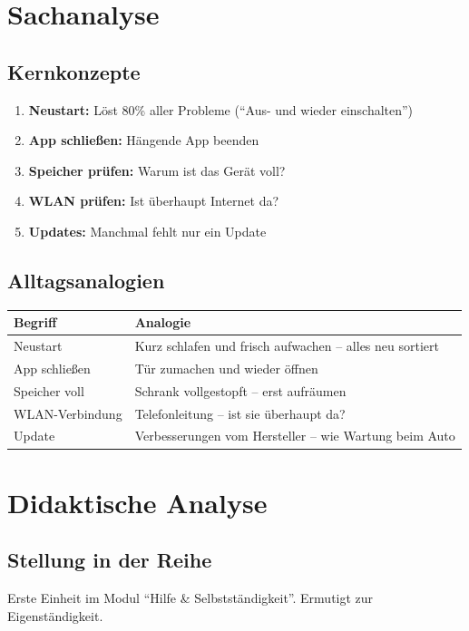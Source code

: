 \documentclass[11pt,a4paper]{article}
\begin{document}
\section{Sachanalyse}

\subsection{Kernkonzepte}
\begin{enumerate}
    \item \textbf{Neustart:} Löst 80\% aller Probleme (``Aus- und wieder einschalten'')
    \item \textbf{App schließen:} Hängende App beenden
    \item \textbf{Speicher prüfen:} Warum ist das Gerät voll?
    \item \textbf{WLAN prüfen:} Ist überhaupt Internet da?
    \item \textbf{Updates:} Manchmal fehlt nur ein Update
\end{enumerate}

\subsection{Alltagsanalogien}
\begin{tabular}{|l|p{8cm}|}
\hline
\textbf{Begriff} & \textbf{Analogie} \\
\hline
Neustart & Kurz schlafen und frisch aufwachen -- alles neu sortiert \\
App schließen & Tür zumachen und wieder öffnen \\
Speicher voll & Schrank vollgestopft -- erst aufräumen \\
WLAN-Verbindung & Telefonleitung -- ist sie überhaupt da? \\
Update & Verbesserungen vom Hersteller -- wie Wartung beim Auto \\
\hline
\end{tabular}

\section{Didaktische Analyse}

\subsection{Stellung in der Reihe}
Erste Einheit im Modul ``Hilfe \& Selbstständigkeit''. Ermutigt zur Eigenständigkeit.
\end{document}
